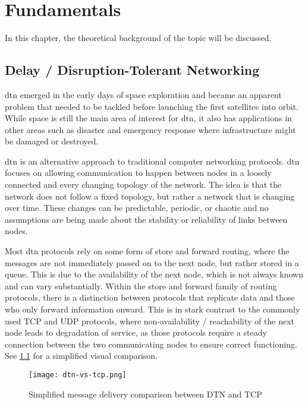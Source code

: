\chapter{Fundamentals}

In this chapter, the theoretical background of the topic will be discussed.

\section{Delay / Disruption-Tolerant Networking}

\ac{dtn} emerged in the early days of space exploration and became an apparent problem that needed to be tackled before launching the first satellites into orbit. While space is still the main area of interest for \ac{dtn}, it also has applications in other areas such as disaster and emergency response where infrastructure might be damaged or destroyed.

\ac{dtn} is an alternative approach to traditional computer networking protocols. \ac{dtn} focuses on allowing communication to happen between nodes in a loosely connected and every changing topology of the network. The idea is that the network does not follow a fixed topology, but rather a network that is changing over time.
These changes can be predictable, periodic, or chaotic and no assumptions are being made about the stability or reliability of links between nodes.

Most \ac{dtn} protocols rely on some form of store and forward routing, where the messages are not immediately passed on to the next node, but rather stored in a queue. This is due to the availability of the next node, which is not always known and can vary substantially.
Within the store and forward family of routing protocols, there is a distinction between protocols that replicate data and those who only forward information onward.
This is in stark contrast to the commonly used TCP and UDP protocols, where non-availability / reachability of the next node leads to degradation of service, as those protocols require a steady connection between the two communicating nodes to ensure correct functioning. See \ref{fig:dtn-vs-tcp} for a simplified visual comparison.

\begin{figure}[h]
  \label{fig:dtn-vs-tcp}
  \caption{Simplified message delivery comparison between DTN and TCP}
  \centering
  \texttt{[image: dtn-vs-tcp.png]}
\end{figure}

